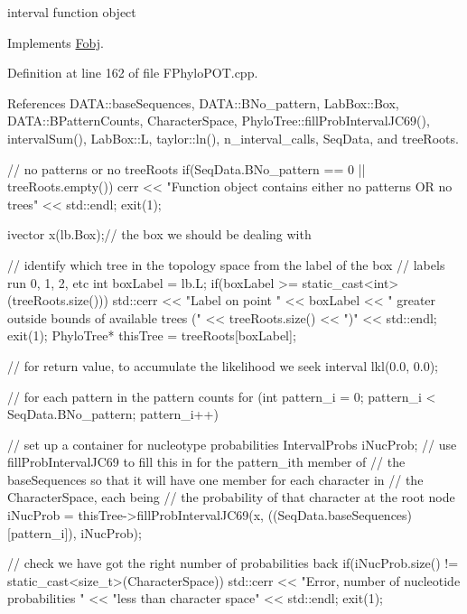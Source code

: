 interval function object 



\-Implements \hyperlink{classFobj_acf5ccd1fd7b302c8a1c77081b606a6ad}{\-Fobj}.



\-Definition at line 162 of file \-F\-Phylo\-P\-O\-T.\-cpp.



\-References \-D\-A\-T\-A\-::base\-Sequences, \-D\-A\-T\-A\-::\-B\-No\-\_\-pattern, \-Lab\-Box\-::\-Box, \-D\-A\-T\-A\-::\-B\-Pattern\-Counts, \-Character\-Space, \-Phylo\-Tree\-::fill\-Prob\-Interval\-J\-C69(), interval\-Sum(), \-Lab\-Box\-::\-L, taylor\-::ln(), n\-\_\-interval\-\_\-calls, \-Seq\-Data, and tree\-Roots.


\begin{DoxyCode}
{
                    // no patterns or no treeRoots
  if(SeqData.BNo_pattern == 0 || treeRoots.empty())
  {
    cerr << "Function object contains either no patterns OR no trees" 
         << std::endl;
    exit(1);
  }

  ivector x(lb.Box);// the box we should be dealing with

  // identify which tree in the topology space from the label of the box
                    // labels run 0, 1, 2, etc
  int boxLabel = lb.L;
  if(boxLabel >= static_cast<int>(treeRoots.size()))
  {
    std::cerr << "Label on point " << boxLabel <<
      " greater outside bounds of available trees ("
      << treeRoots.size() << ")" << std::endl;
    exit(1);
  }
  PhyloTree* thisTree = treeRoots[boxLabel];

                    // for return value, to accumulate the likelihood we seek
  interval lkl(0.0, 0.0);

  // for each pattern in the pattern counts
  for (int pattern_i = 0; pattern_i < SeqData.BNo_pattern; pattern_i++)
  {

                    // set up a container for nucleotype probabilities
    IntervalProbs iNucProb;
    // use fillProbIntervalJC69 to fill this in for the pattern_ith member of 
    // the baseSequences so that it will have one member for each character in 
    // the CharacterSpace, each being
    // the probability of that character at the root node
    iNucProb = 
      thisTree->fillProbIntervalJC69(x, ((SeqData.baseSequences)[pattern_i]), 
                                     iNucProb);

    // check we have got the right number of probabilities back
    if(iNucProb.size() != static_cast<size_t>(CharacterSpace))
    {
      std::cerr << "Error, number of nucleotide probabilities "
                << "less than character space" << std::endl;
      exit(1);
    }

}}
\end{DoxyCode}
